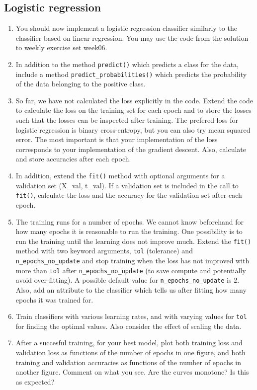 \documentclass[a4paper,landscape]{article}
\begin{document}
    \subsection{Logistic regression}\label{logistic-regression}

\begin{enumerate}
\def\labelenumi{\alph{enumi})}
\item
  You should now implement a logistic regression classifier similarly to
  the classifier based on linear regression. You may use the code from
  the solution to weekly exercise set week06.
\item
  In addition to the method \texttt{predict()} which predicts a class
  for the data, include a method \texttt{predict\_probabilities()} which
  predicts the probability of the data belonging to the positive class.
\item
  So far, we have not calculated the loss explicitly in the code. Extend
  the code to calculate the loss on the training set for each epoch and
  to store the losses such that the losses can be inspected after
  training. The prefered loss for logistic regression is binary
  cross-entropy, but you can also try mean squared error. The most
  important is that your implementation of the loss corresponds to your
  implementation of the gradient descent. Also, calculate and store
  accuracies after each epoch.
\item
  In addition, extend the \texttt{fit()} method with optional arguments
  for a validation set (X\_val, t\_val). If a validation set is included
  in the call to \texttt{fit()}, calculate the loss and the accuracy for
  the validation set after each epoch.
\item
  The training runs for a number of epochs. We cannot know beforehand
  for how many epochs it is reasonable to run the training. One
  possibility is to run the training until the learning does not improve
  much. Extend the \texttt{fit()} method with two keyword arguments,
  \texttt{tol} (tolerance) and \texttt{n\_epochs\_no\_update} and stop
  training when the loss has not improved with more than \texttt{tol}
  after \texttt{n\_epochs\_no\_update} (to save compute and potentially
  avoid over-fitting). A possible default value for
  \texttt{n\_epochs\_no\_update} is 2. Also, add an attribute to the
  classifier which tells us after fitting how many epochs it was trained
  for.
\item
  Train classifiers with various learning rates, and with varying values
  for \texttt{tol} for finding the optimal values. Also consider the
  effect of scaling the data.
\item
  After a succesful training, for your best model, plot both training
  loss and validation loss as functions of the number of epochs in one
  figure, and both training and validation accuracies as functions of
  the number of epochs in another figure. Comment on what you see. Are
  the curves monotone? Is this as expected?
\end{enumerate}
\end{document}
